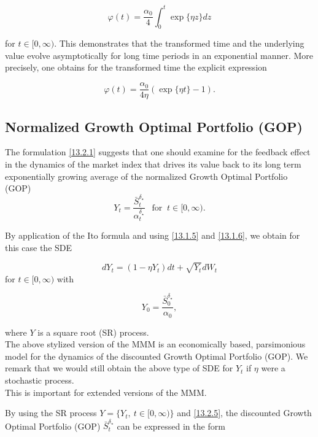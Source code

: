 \documentclass[a4 paper, 12pt]{report}
\theoremstyle{plain}
\begin{document}
\begin{equation}\label{13.2.2}
\varphi(t) = \frac{\alpha_0}{4}\int_0^t\exp\{\eta z\}dz
\end{equation}

for $t \in [0,\infty)$. This demonstrates that the transformed time and the underlying value evolve asymptotically for long time periods in an exponential manner. More precisely, one obtains for the transformed time the explicit expression


\begin{equation}\label{13.2.3}
\varphi(t) = \frac{\alpha_0}{4\eta}(\exp\{\eta t\} - 1).
\end{equation}

\subsection*{Normalized Growth Optimal Portfolio (GOP)}
The formulation \eqref{13.2.1} suggests that one should examine for the feedback effect in the dynamics of the market index that drives its value back to its long term exponentially growing average of the normalized Growth Optimal Portfolio (GOP)
\begin{equation}\label{13.2.4}
Y_t = \frac{\bar{S}_t^{\delta_\star}}{\alpha_t^{\delta_\star}}~~\mbox{  for  }~t\in[0,\infty).
\end{equation}

By application of the Ito formula and using \eqref{13.1.5}  and \eqref{13.1.6}, we obtain for this case the SDE


\begin{equation}\label{13.2.5}
dY_t = (1-\eta Y_t)dt+\sqrt{Y_t}dW_t
\end{equation}
for $t\in[0,\infty)$ with


\begin{equation}\label{13.2.6}
Y_0 = \frac{\bar{S}_0^{\delta_\star}}{\alpha_0},
\end{equation}

where $Y$ is a square root (SR) process.\\
The above stylized version of the MMM is an economically based, parsimonious model for the dynamics of the
discounted Growth Optimal Portfolio (GOP). We remark that we would still obtain the above type of SDE for $Y_t$ if $\eta$ were a stochastic process.\\
This is important for extended versions of the MMM.\\
\par By using the SR process $Y = \{Y_t,~t\in[0,\infty)\}$ and \eqref{13.2.5}, the discounted Growth Optimal Portfolio (GOP) $\bar{S}_t^{\delta_\star}$ can be expressed in the form 
\end{document}
